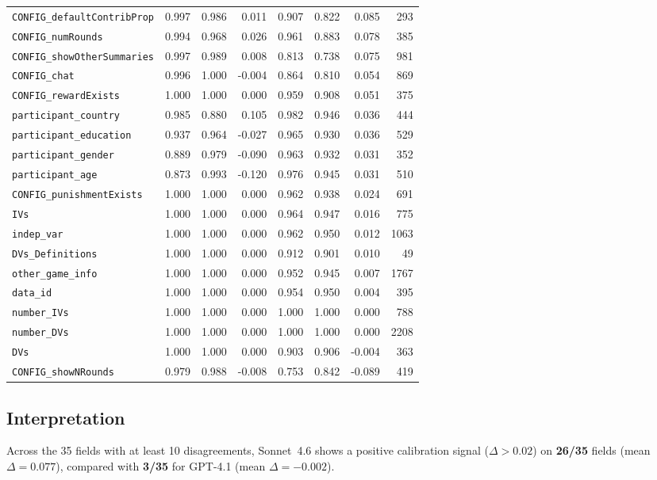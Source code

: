 \documentclass[11pt,a4paper]{article}
\begin{document}
\begin{center}
\begin{tabular}{lrr@{\hskip 6pt}rrr@{\hskip 6pt}rr}
\texttt{CONFIG\_defaultContribProp} & 0.997 & 0.986 & 0.011 & 0.907 & 0.822 & 0.085 & 293\\
\texttt{CONFIG\_numRounds} & 0.994 & 0.968 & 0.026 & 0.961 & 0.883 & 0.078 & 385\\
\texttt{CONFIG\_showOtherSummaries} & 0.997 & 0.989 & 0.008 & 0.813 & 0.738 & 0.075 & 981\\
\texttt{CONFIG\_chat} & 0.996 & 1.000 & -0.004 & 0.864 & 0.810 & 0.054 & 869\\
\texttt{CONFIG\_rewardExists} & 1.000 & 1.000 & 0.000 & 0.959 & 0.908 & 0.051 & 375\\
\texttt{participant\_country} & 0.985 & 0.880 & 0.105 & 0.982 & 0.946 & 0.036 & 444\\
\texttt{participant\_education} & 0.937 & 0.964 & -0.027 & 0.965 & 0.930 & 0.036 & 529\\
\texttt{participant\_gender} & 0.889 & 0.979 & -0.090 & 0.963 & 0.932 & 0.031 & 352\\
\texttt{participant\_age} & 0.873 & 0.993 & -0.120 & 0.976 & 0.945 & 0.031 & 510\\
\texttt{CONFIG\_punishmentExists} & 1.000 & 1.000 & 0.000 & 0.962 & 0.938 & 0.024 & 691\\
\texttt{IVs} & 1.000 & 1.000 & 0.000 & 0.964 & 0.947 & 0.016 & 775\\
\texttt{indep\_var} & 1.000 & 1.000 & 0.000 & 0.962 & 0.950 & 0.012 & 1063\\
\texttt{DVs\_Definitions} & 1.000 & 1.000 & 0.000 & 0.912 & 0.901 & 0.010 & 49\\
\texttt{other\_game\_info} & 1.000 & 1.000 & 0.000 & 0.952 & 0.945 & 0.007 & 1767\\
\texttt{data\_id} & 1.000 & 1.000 & 0.000 & 0.954 & 0.950 & 0.004 & 395\\
\texttt{number\_IVs} & 1.000 & 1.000 & 0.000 & 1.000 & 1.000 & 0.000 & 788\\
\texttt{number\_DVs} & 1.000 & 1.000 & 0.000 & 1.000 & 1.000 & 0.000 & 2208\\
\texttt{DVs} & 1.000 & 1.000 & 0.000 & 0.903 & 0.906 & -0.004 & 363\\
\texttt{CONFIG\_showNRounds} & 0.979 & 0.988 & -0.008 & 0.753 & 0.842 & -0.089 & 419\\
\bottomrule
\end{tabular}
\end{center}
\subsection{Interpretation}
Across the 35 fields with at least 10 disagreements,
Sonnet~4.6 shows a positive calibration signal ($\Delta > 0.02$) on
\textbf{26/35} fields (mean $\Delta = 0.077$),
compared with \textbf{3/35} for
GPT-4.1 (mean $\Delta = -0.002$).
\end{document}
